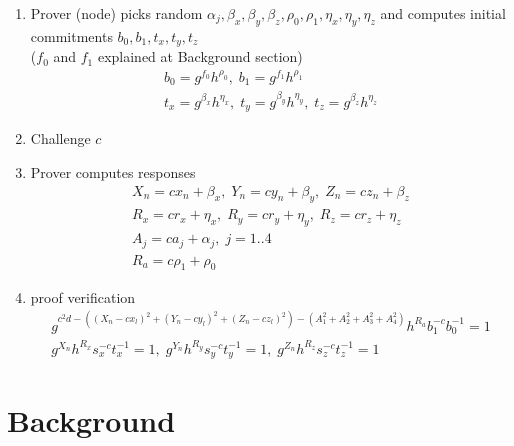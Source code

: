 \documentclass[a4paper,12pt]{article}
\begin{document}
\begin{enumerate}
\item
  Prover (node) picks random $\alpha_j, \beta_x, \beta_y, \beta_z, \rho_0, \rho_1, \eta_x, \eta_y, \eta_z$
  and computes initial commitments $b_0, b_1, t_x, t_y, t_z$ \\
  ($f_0$ and $f_1$ explained at Background section)
\begin{gather}
  b_0 = g^{f_0} h^{\rho_0}, \; b_1 = g^{f_1} h^{\rho_1}  \\
  t_x = g^{\beta_x} h^{\eta_x},  \;
  t_y = g^{\beta_y} h^{\eta_y},  \;
  t_z = g^{\beta_z} h^{\eta_z}
\end{gather}

\item
  Challenge $c$
\item
  Prover computes responses
\begin{gather}
  X_n = c x_n + \beta_x, \;
  Y_n = c y_n + \beta_y, \;
  Z_n = c z_n + \beta_z  \\
  R_x = c r_x + \eta_x, \;
  R_y = c r_y + \eta_y, \;
  R_z = c r_z + \eta_z  \\
  A_j = c a_j + \alpha_j, \; j=1..4  \\
  R_a = c \rho_1 + \rho_0
\end{gather}

\item
  proof verification
\begin{gather}
\label{verf-distn}
  g^{c^2d - ((X_n - c x_l)^2 + (Y_n - c y_l)^2 + (Z_n - c z_l)^2 ) - (A_1^2 + A_2^2 + A_3^2 + A_4^2)} h^{R_a} b_1^{-c} b_0^{-1} = 1  \\
  g^{X_n} h^{R_x} s_x^{-c} t_x^{-1} = 1,  \;
  g^{Y_n} h^{R_y} s_y^{-c} t_y^{-1} = 1,  \;
  g^{Z_n} h^{R_z} s_z^{-c} t_z^{-1} = 1
\end{gather}
  
\end{enumerate}

\section{Background}
\end{document}

